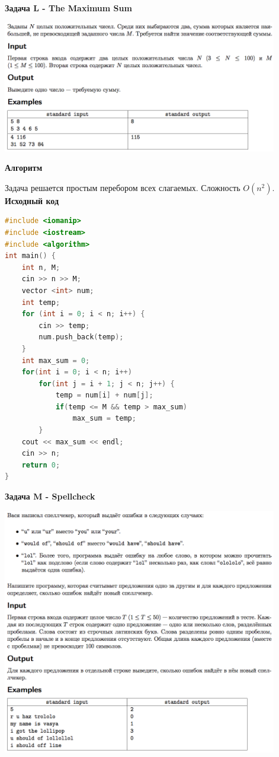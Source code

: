 \documentclass[a4paper,12pt]{article}
\begin{document}
\newpage
\textbf{{\large Задача L - The Maximum Sum}}

\begin{center}
\includegraphics[width=0.9\textwidth]{OC_Japan/OC_Japan_L.png}\\ [1cm]
\end{center}

\textbf{{\large Алгоритм}}

Задача решается простым перебором всех слагаемых. Сложность $O(n^2)$. \\

\textbf{{\large Исходный код}} \\
\begin{lstlisting}[language=C++]
#include <iomanip>
#include <iostream>
#include <algorithm>
int main() {
    int n, M;
	cin >> n >> M;
	vector <int> num;
	int temp;
	for (int i = 0; i < n; i++) {
		cin >> temp;
		num.push_back(temp);
	}
	int max_sum = 0;
	for(int i = 0; i < n; i++)
		for(int j = i + 1; j < n; j++) {
			temp = num[i] + num[j];
			if(temp <= M && temp > max_sum)
				max_sum = temp;
		}
	cout << max_sum << endl;
    cin >> n;
    return 0;
}
\end{lstlisting}

\newpage
\textbf{{\large Задача M - Spellcheck}}

\begin{center}
\includegraphics[width=0.9\textwidth]{OC_Japan/OC_Japan_M.png}\\ [1cm]
\end{center}
\end{document}
